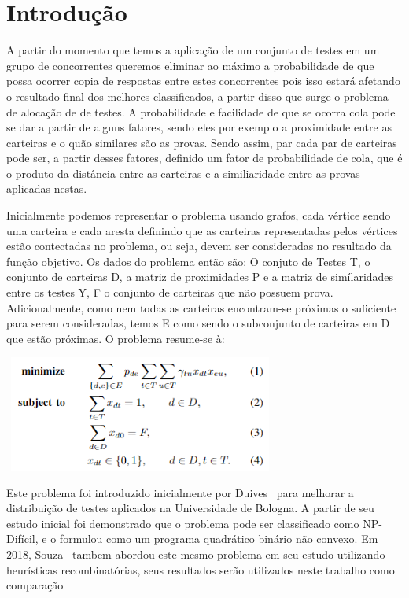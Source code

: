 \documentclass[a4paper,11pt]{article}
\begin{document}
 
\newpage
\section{Introdu\c{c}\~ao} 
 
A partir do momento que temos a aplica\c c\~ao de um conjunto de testes em um grupo de concorrentes queremos eliminar ao m\'aximo a probabilidade de que possa ocorrer copia de respostas entre estes concorrentes 
pois isso estar\'a afetando o resultado final dos melhores classificados, a partir disso que surge o problema de aloca\c c\~ao de de testes. 
A probabilidade e facilidade de que se ocorra cola pode se dar a partir de alguns fatores,
sendo eles por exemplo a proximidade entre as carteiras e o qu\~ao similares s\~ao as provas. Sendo assim, par cada par de carteiras pode ser, a partir desses fatores, definido um fator de probabilidade de cola, que \'e o produto da dist\^ancia entre as carteiras e a similiaridade entre as provas aplicadas nestas.

Inicialmente podemos representar o problema usando grafos, cada v\'ertice sendo uma carteira e cada aresta definindo que as carteiras representadas pelos v\'ertices est\~ao contectadas no problema, ou seja, devem ser consideradas no resultado da fun\c c\~ao objetivo. Os dados do problema ent\~ao s\~ao: O conjuto de Testes T, o conjunto de carteiras D, a matriz de proximidades P e a matriz de sim\'ilaridades entre os testes Y, F o conjunto de carteiras que n\~ao possuem prova. Adicionalmente, como nem todas as carteiras encontram-se pr\'oximas o suficiente para serem consideradas, temos E como sendo o subconjunto de carteiras em D que est\~ao pr\'oximas. O problema resume-se \`a:



\includegraphics[width=9cm, height=3.8cm]{problem.png}


Este problema foi introduzido inicialmente por Duives~\citep{duives:13} para melhorar a distribui\c c\~ao de testes aplicados na Universidade de Bologna. A partir de seu estudo inicial foi demonstrado que o 
problema pode ser classificado como NP-Dif\'icil, e o formulou como um programa quadr\'atico bin\'ario n\~ao convexo. Em 2018, Souza~\citep{web:16} tambem abordou este mesmo problema em seu estudo utilizando heur\'isticas recombinat\'orias, seus resultados ser\~ao utilizados neste trabalho como compara\c c\~ao
\end{document}
